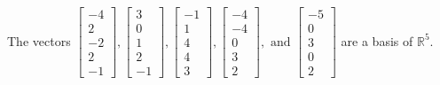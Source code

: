 \begin{exercise}
\begin{exerciseStatement}
  \end{exerciseStatement}
  \begin{exerciseAnswer}
   The vectors \(\left[\begin{array}{r}
-4 \\
2 \\
-2 \\
2 \\
-1
\end{array}\right] , \left[\begin{array}{r}
3 \\
0 \\
1 \\
2 \\
-1
\end{array}\right] , \left[\begin{array}{r}
-1 \\
1 \\
4 \\
4 \\
3
\end{array}\right] , \left[\begin{array}{r}
-4 \\
-4 \\
0 \\
3 \\
2
\end{array}\right] , \text{ and } \left[\begin{array}{r}
-5 \\
0 \\
3 \\
0 \\
2
\end{array}\right]\) 
  	 are  a basis of \(\mathbb{R}^5\).
  


  \end{exerciseAnswer}
\end{exercise}